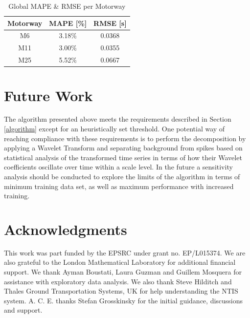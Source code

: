 \documentclass[conference, letterpaper]{IEEEtran}
\begin{document}
\begin{table}[htbp]
	\caption{Global MAPE \& RMSE per Motorway}
	\begin{center}
		\begin{tabular}{|c|c|c|}
			\hline
			\textbf{Motorway}&{\textbf{MAPE [\%]}}&{\textbf{RMSE [s]}} \\
			\hline
			M6& 3.18\%& 0.0368\\
			\hline
			M11& 3.00\%& 0.0355\\
			\hline
			M25& 5.52\%& 0.0667\\
			\hline
		\end{tabular}
		\label{mapeglobal}
	\end{center}
\end{table}

\section{Future Work}
The algorithm presented above meets the requirements described in Section \ref{algorithm} except for an heuristically set threshold. 
One potential way of reaching compliance with these requirements is to perform the decomposition by applying a Wavelet Transform and separating background from spikes based on statistical analysis of the transformed time series in terms of how their Wavelet coefficients oscillate over time within a scale level. 
In the future a sensitivity analysis should be conducted to explore the limits of the algorithm in terms of minimum training data set, as well as maximum performance with increased training.
\section*{Acknowledgments}
This work was part funded by the EPSRC under grant no. EP/L015374. 
We are also grateful to the London Mathematical Laboratory for additional financial support. 
We thank Ayman Boustati, Laura Guzman and Guillem Mosquera for assistance with exploratory data analysis. 
We also thank Steve Hilditch and Thales Ground Transportation Systems, UK for help understanding the NTIS system.  
A. C. E. thanks Stefan Grosskinsky for the initial guidance, discussions and support.
\end{document}
